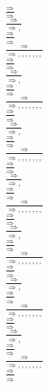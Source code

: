 \documentclass[11pt]{article}
\begin{document}
\begin{center}
\bigskip
\\$\frac{\Rightarrow }{\Rightarrow }$
\bigskip
\\$\frac{\Rightarrow }{\Rightarrow , }$
\bigskip
\\$\frac{\Rightarrow }{\Rightarrow }$
\bigskip
\\$\frac{\Rightarrow }{\Rightarrow , , , , , , , }$
\bigskip
\\$\frac{\Rightarrow }{\Rightarrow }$
\bigskip
\\$\frac{\Rightarrow }{\Rightarrow , }$
\bigskip
\\$\frac{\Rightarrow }{\Rightarrow }$
\bigskip
\\$\frac{\Rightarrow }{\Rightarrow , , , , , , , }$
\bigskip
\\$\frac{\Rightarrow }{\Rightarrow }$
\bigskip
\\$\frac{\Rightarrow }{\Rightarrow , }$
\bigskip
\\$\frac{\Rightarrow }{\Rightarrow }$
\bigskip
\\$\frac{\Rightarrow }{\Rightarrow , , , , , , , }$
\bigskip
\\$\frac{\Rightarrow }{\Rightarrow }$
\bigskip
\\$\frac{\Rightarrow }{\Rightarrow , }$
\bigskip
\\$\frac{\Rightarrow }{\Rightarrow }$
\bigskip
\\$\frac{\Rightarrow }{\Rightarrow , , , , , , , }$
\bigskip
\\$\frac{\Rightarrow }{\Rightarrow }$
\bigskip
\\$\frac{\Rightarrow }{\Rightarrow , }$
\bigskip
\\$\frac{\Rightarrow }{\Rightarrow }$
\bigskip
\\$\frac{\Rightarrow }{\Rightarrow , , , , , , , }$
\bigskip
\\$\frac{\Rightarrow }{\Rightarrow }$
\bigskip
\\$\frac{\Rightarrow }{\Rightarrow , }$
\bigskip
\\$\frac{\Rightarrow }{\Rightarrow }$
\bigskip
\\$\frac{\Rightarrow }{\Rightarrow , , , , , , , }$
\bigskip
\\$\frac{\Rightarrow }{\Rightarrow }$
\bigskip
\\$\frac{\Rightarrow }{\Rightarrow , }$
\bigskip
\\$\frac{\Rightarrow }{\Rightarrow }$
\bigskip
\\$\frac{\Rightarrow }{\Rightarrow , , , , , , , }$
\bigskip
\\$\frac{\Rightarrow }{\Rightarrow }$

\end{center}
\end{document}
